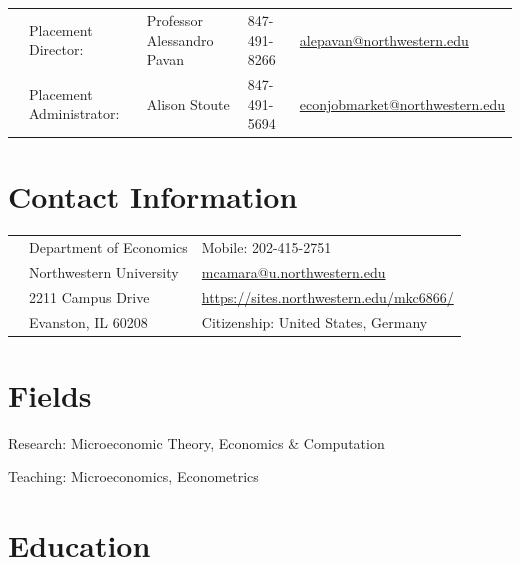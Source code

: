 \documentclass[margin,line]{res}
\newenvironment{list1}{
  \begin{list}{\ding{113}}{%
      \setlength{\itemsep}{.025in}
      \setlength{\parsep}{0in} \setlength{\parskip}{0in}
      \setlength{\topsep}{0in} \setlength{\partopsep}{0in}
      \setlength{\leftmargin}{0.17in}}}{\end{list}}
\begin{document}

~\\
~\\

\begin{resume}
\thispagestyle{plain} %

\begin{table}[h]
\footnotesize
\begin{tabular}{@{}p{0.20in}p{1.5in}p{1.4in}p{.7in}p{1.5in}}
& Placement Director:	& Professor Alessandro Pavan & 847-491-8266  & \href{mailto: alepavan@northwestern.edu}{alepavan@northwestern.edu}\\
& Placement Administrator:	& Alison Stoute &	847-491-5694  & \href{mailto: econjobmarket@northwestern.edu}{econjobmarket@northwestern.edu}\\
 \end{tabular}
\end{table}

\section{ Contact Information}
\vspace{.05in}
\begin{tabular}{@{}p{0.20in}p{2.75in}p{2.75in}}
 & Department of Economics           &Mobile: 202-415-2751 \\
 & Northwestern University   & \href{mailto: mcamara@u.northwestern.edu}{mcamara@u.northwestern.edu} \\
 & 2211 Campus Drive & \href{https://sites.northwestern.edu/mkc6866/}{https://sites.northwestern.edu/mkc6866/}\\
 & Evanston, IL 60208  & Citizenship: United States, Germany
\end{tabular}

\section{ Fields}
\begin{list1}
\item[] Research: Microeconomic Theory, Economics \& Computation
\item[] Teaching: Microeconomics, Econometrics
\vspace*{.05in}
\end{list1}

\section{ Education}\begin{tiny}


\end{tiny}
\end{resume}
\end{document}
